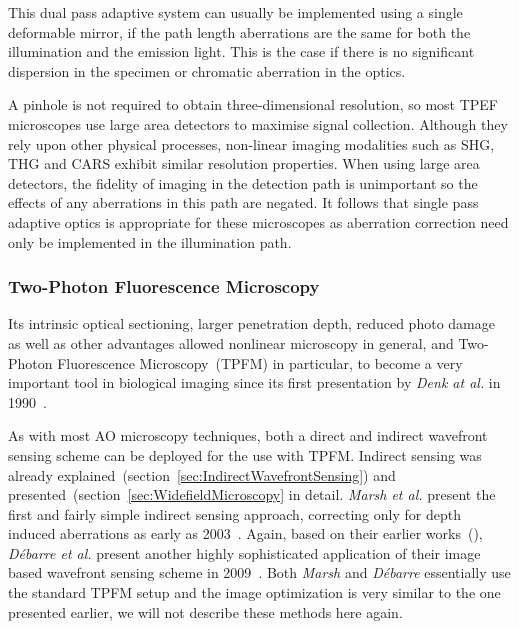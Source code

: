 This dual pass adaptive 
system can usually be implemented using a single deformable mirror, if the 
path length aberrations are the same for both the illumination and the 
emission light. This is the case if there is no significant dispersion in the 
specimen or chromatic aberration in the optics.

A pinhole is not required to obtain three-dimensional resolution, so most 
TPEF microscopes use large area detectors to maximise signal collection. 
Although they rely upon other physical processes, non-linear imaging 
modalities such as SHG, THG and CARS exhibit similar resolution properties. 
When using large area detectors, the fidelity of imaging in the detection 
path is unimportant so the effects of any aberrations in this path are 
negated. It follows that single pass adaptive optics is appropriate for these 
microscopes as aberration correction need only be implemented in the 
illumination path.

\cite{book_confocal}
\cite{scan_CFM}

\subsubsection{Two-Photon Fluorescence Microscopy}
\label{sec:twoPhotonExcitation}

Its intrinsic optical sectioning, larger penetration depth, reduced photo damage as well as other advantages allowed nonlinear microscopy in general, and Two-Photon Fluorescence Microscopy~(TPFM) in particular, to become a very important tool in biological imaging since its first presentation by \emph{Denk at al.} in 1990~\cite{scan_TPFM_principle}.

As with most AO microscopy techniques, both a direct and indirect wavefront sensing scheme can be deployed for the use with TPFM. Indirect sensing was already explained~(section~\ref{sec:IndirectWavefrontSensing}) and presented~(section~\ref{sec:WidefieldMicroscopy} in detail. \emph{Marsh et al.} present the first and fairly simple indirect sensing approach, correcting only for depth induced aberrations as early as 2003~\cite{scan_TPFM_pratical}. Again, based on their earlier works~(\cite{wide_AOM_loew_freq,wide_AOM_structured_illu}), \emph{D\'{e}barre et al.} present another highly sophisticated application of their image based wavefront sensing scheme in 2009~\cite{scan_TPFM_image_based}. Both \emph{Marsh} and \emph{D\'{e}barre} essentially use the standard TPFM setup and the image optimization is very similar to the one presented earlier, we will not describe these methods here again.

